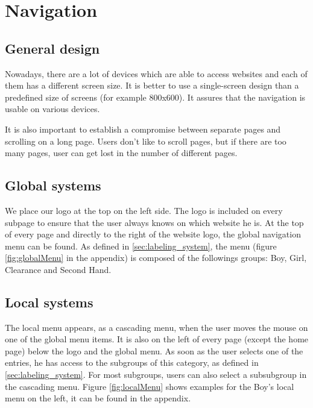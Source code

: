 \section{Navigation}

\subsection{General design}

Nowadays, there are a lot of devices which are able to access websites and each of them has a different screen size. It is better to use a single-screen design than a predefined size of screens (for example 800x600). It assures that the navigation is usable on various devices. 

It is also important to establish a compromise between separate pages and scrolling on a long page. Users don't like to scroll pages, but if there are too many pages, user can get lost in the number of different pages.

\subsection{Global systems}

We place our logo at the top on the left side. The logo is included on every subpage to ensure that the user always knows on which website he is.
At the top of every page and directly to the right of the website logo, the global navigation menu can be found. As defined in \ref{sec:labeling_system}, the menu (figure \ref{fig:globalMenu} in the appendix) is composed of the followings groups: Boy, Girl, Clearance and Second Hand.

\subsection{Local systems}\label{sec:local_systems}
The local menu appears, as a cascading menu, when the user moves the mouse on one of the global menu items. It is also on the left of every page (except the home page) below the logo and the global menu. As soon as the user selects one of the entries, he has access to the subgroups of this category, as defined in \ref{sec:labeling_system}. For most subgroups, users can also select a subsubgroup in the cascading menu. Figure \ref{fig:localMenu} shows examples for the Boy's local menu on the left, it can be found in the appendix.

